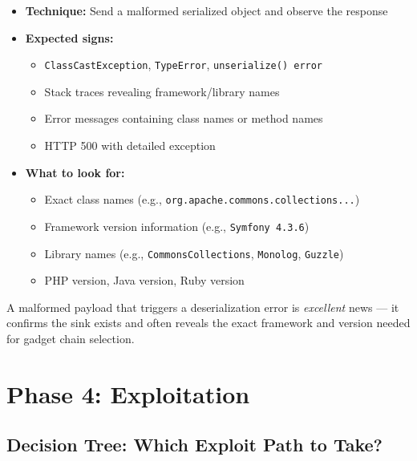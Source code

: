 \documentclass[11pt]{article}
\begin{document}
\begin{itemize}
    \item \textbf{Technique:} Send a malformed serialized object and observe the response
    \item \textbf{Expected signs:}
    \begin{itemize}
        \item \texttt{ClassCastException}, \texttt{TypeError}, \texttt{unserialize() error}
        \item Stack traces revealing framework/library names
        \item Error messages containing class names or method names
        \item HTTP 500 with detailed exception
    \end{itemize}
    \item \textbf{What to look for:}
    \begin{itemize}
        \item Exact class names (e.g., \texttt{org.apache.commons.collections...})
        \item Framework version information (e.g., \texttt{Symfony 4.3.6})
        \item Library names (e.g., \texttt{CommonsCollections}, \texttt{Monolog}, \texttt{Guzzle})
        \item PHP version, Java version, Ruby version
    \end{itemize}
\end{itemize}

\begin{causebox}
A malformed payload that triggers a deserialization error is \textit{excellent} news — it confirms the sink exists and often reveals the exact framework and version needed for gadget chain selection.
\end{causebox}

\section{Phase 4: Exploitation}

\subsection{Decision Tree: Which Exploit Path to Take?}
\end{document}
